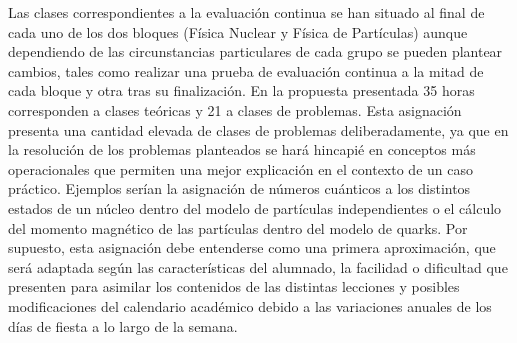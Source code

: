 \documentclass[a4paper,12pt,twoside]{article}
\begin{document}
Las clases correspondientes a la evaluaci\'on continua se han situado al final de cada uno de los dos bloques (Física Nuclear y Física de Partículas) aunque dependiendo de las circunstancias particulares de cada grupo se pueden plantear cambios, tales como realizar una prueba de evaluación continua a la mitad de cada bloque y otra tras su finalización. En la propuesta presentada 35 horas corresponden a clases teóricas y 21 a clases de problemas. Esta asignación presenta una cantidad elevada de clases de problemas deliberadamente, ya que en la resolución de los problemas planteados se hará hincapié en conceptos más operacionales que permiten una mejor explicación en el contexto de un caso práctico. Ejemplos serían la asignación de números cuánticos a los distintos estados de un núcleo dentro del modelo de partículas independientes o el cálculo del momento magnético de las partículas dentro del modelo de quarks. Por supuesto, esta asignación debe entenderse como una primera aproximación, que será adaptada según las características del alumnado, la facilidad o dificultad que presenten para asimilar los contenidos de las distintas lecciones y posibles modificaciones del calendario académico debido a las variaciones anuales de los días de fiesta a lo largo de la semana.
\end{document}
